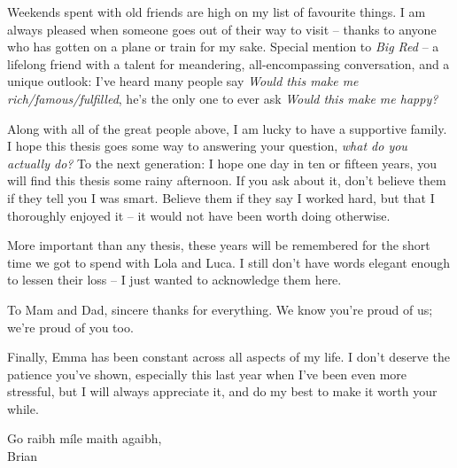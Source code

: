 \par 

Weekends spent with old friends are high on my list of favourite things. 
I am always pleased when someone goes out of their way to visit -- 
    thanks to anyone who has gotten on a plane or train for my sake. 
Special mention to \emph{Big Red} -- a lifelong friend with a talent for 
    meandering, all-encompassing conversation, and a unique outlook:
    I've heard many people say \emph{Would this make me rich/famous/fulfilled}, 
    he's the only one to ever ask \emph{Would this make me happy?}
\par 

Along with all of the great people above, 
    I am lucky to have a supportive family. 
I hope this thesis goes some way to answering your question, 
    \emph{what do you actually do?} 
To the next generation: 
    I hope one day in ten or fifteen years, you will find this thesis some rainy afternoon. 
If you ask about it, don't believe them if they tell you I was smart. 
Believe them if they say I worked hard, but that I thoroughly enjoyed it -- it would not have been worth doing otherwise. 
\par 
More important than any thesis, these years will be remembered for 
    the short time we got to spend with Lola and Luca. 
I still don't have words elegant enough to lessen their loss -- I just wanted to acknowledge them here. 
\par 

To Mam and Dad, sincere thanks for everything. 
We know you're proud of us; 
    we're proud of you too. 
\par 
Finally, Emma has been constant across all aspects of my life.
I don't deserve the patience you've shown, especially this last year when I've been even more stressful, 
    but I will always appreciate it, and do my best to make it worth your while.  

\begin{flushright}
    Go raibh m\'ile maith agaibh, \\
    Brian
\end{flushright}